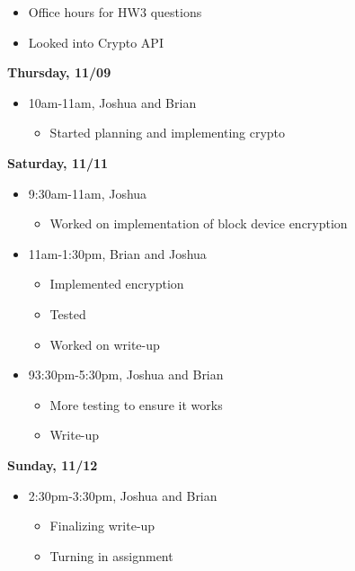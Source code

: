 \documentclass[letterpaper, onecolumn, draftclsnofoot, 10pt, compsoc]{IEEEtran}
\begin{document}
\begin{singlespace}
\begin{itemize}
\begin{itemize}
                    \item Office hours for HW3 questions 
                    \item Looked into Crypto API 
                \end{itemize}
            \end{itemize}
        \textbf{Thursday, 11/09}
            \begin{itemize}
                \item 10am-11am, Joshua and Brian 
                \begin{itemize}
                    \item Started planning and implementing crypto 
                \end{itemize}
            \end{itemize}
        \textbf{Saturday, 11/11}
            \begin{itemize}
                \item 9:30am-11am, Joshua
                \begin{itemize}
                    \item Worked on implementation of block device encryption
                \end{itemize}
                \item 11am-1:30pm, Brian and Joshua
                \begin{itemize}
                    \item Implemented encryption
                    \item Tested 
                    \item Worked on write-up 
                \end{itemize}
                \item 93:30pm-5:30pm, Joshua and Brian 
                \begin{itemize}
                    \item More testing to ensure it works 
                    \item Write-up
                \end{itemize}
            \end{itemize}
        \textbf{Sunday, 11/12}
            \begin{itemize}
                \item 2:30pm-3:30pm, Joshua and Brian
                \begin{itemize}
                    \item Finalizing write-up
                    \item Turning in assignment
                \end{itemize}
            \end{itemize}
    \end{singlespace}
        
\end{document}

